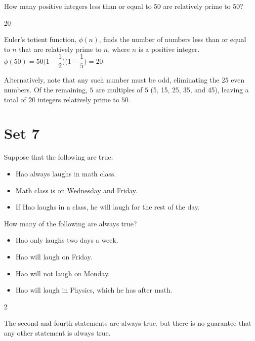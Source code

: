 \documentclass[11pt]{article}
\begin{document}
\begin{problem}%
How many positive integers less than or equal to $50$ are relatively prime to $50$?
\end{problem}

\begin{answer}
20
\end{answer}

\begin{solution}
Euler's totient function, $\phi(n)$, finds the number of numbers less than or equal to $n$ that are relatively prime to $n$, where $n$ is a positive integer. $\phi(50) = 50\bigg(1-\dfrac{1}{2}\bigg)\bigg(1-\dfrac{1}{5}\bigg) = 20$.

Alternatively, note that any such number must be odd, eliminating the $25$ even numbers. Of the remaining, $5$ are multiples of $5$ (5, 15, 25, 35, and 45), leaving a total of $20$ integers relatively prime to $50$.
\end{solution}

\newpage

\section*{Set 7}

\begin{problem}%
Suppose that the following are true:
\begin{itemize}
	\item Hao always laughs in math class.
	\item Math class is on Wednesday and Friday.
	\item If Hao laughs in a class, he will laugh for the rest of the day.
\end{itemize}
How many of the following are always true?
\begin{itemize}
	\item Hao only laughs two days a week.
	\item Hao will laugh on Friday.
	\item Hao will not laugh on Monday.
	\item Hao will laugh in Physics, which he has after math.
\end{itemize}
\end{problem}

\begin{answer}
2
\end{answer}

\begin{solution}
The second and fourth statements are always true, but there is no guarantee that any other statement is always true.
\end{solution}
\end{document}
